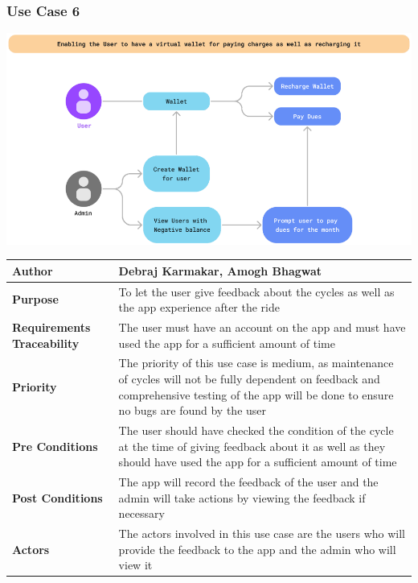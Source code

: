 \documentclass[11pt]{article}
\begin{document}
\subsubsection{Use Case 6}
\begin{center}
\includegraphics*[scale=0.6]{usecase-6.png}\\
\vspace{5mm}
\begin{tabular}{|l|p{10cm}|}
    \hline
    \textbf{Author} & Debraj Karmakar, Amogh Bhagwat\\
    \hline
    \textbf{Purpose} & To let the user give feedback about the cycles as well as the app experience after the ride \\
    \hline
    \textbf{Requirements Traceability} & The user must have an account on the app and must have used the app for a sufficient amount of time\\
    \hline
    \textbf{Priority} & The priority of this use case is medium, as maintenance of cycles will not be fully dependent on feedback and comprehensive testing of the app will be done to ensure no bugs are found by the user\\
    \hline
    \textbf{Pre Conditions} & The user should have checked the condition of the cycle at the time of giving feedback about it as well as they should have used the app for a sufficient amount of time\\
    \hline
    \textbf{Post Conditions} & The app will record the feedback of the user and the admin will take actions by viewing the feedback if necessary\\
    \hline
    \textbf{Actors} & The actors involved in this use case are the users who will provide the feedback to the app and the admin who will view it\\
    \hline
\end{tabular}
\end{center}
\end{document}
